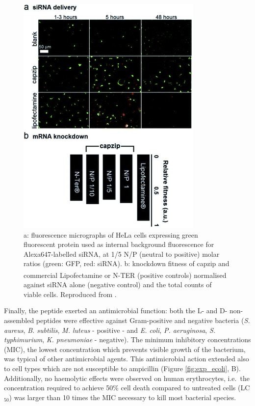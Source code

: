 \begin{figure}
\begin{center}
\includegraphics[width=0.6\linewidth, align = c]{1introduction/pics/capzip_delivery.png}
\caption[Capzip promoted RNA transfection]{a: fluorescence micrographs of HeLa cells expressing green fluorescent protein used as internal background fluorescence for Alexa647-labelled siRNA, at 1/5 N/P (neutral to positive) molar ratios (green: GFP, red: siRNA). b: knockdown fitness of capzip and commercial Lipofectamine\textsuperscript{\textregistered} or N-TER\textsuperscript{\textregistered} (positive controls) normalised against siRNA alone (negative control) and the total counts of viable cells. Reproduced from \citet{Castelletto2016}.} \label{fig:exp_rna}
\end{center}
\end{figure}

Finally, the peptide exerted an antimicrobial function: both the L- and D- non-assembled peptides were effective against Gram-positive and negative bacteria (\emph{S. aureus}, \emph{B. subtilis}, \emph{M. luteus} - positive - and \emph{E. coli}, \emph{P. aeruginosa}, \emph{S. typhimurium}, \emph{K. pneumoniae} - negative).
The minimum inhibitory concentrations (MIC), the lowest concentration which prevents visible growth of the bacterium, was typical of other antimicrobial agents. This antimicrobial action extended also to cell types which are not susceptible to ampicillin (Figure \ref{fig:exp_ecoli}, B).
%
Additionally, no haemolytic effects were observed on human erythrocytes, i.e.\ the concentration required to achieve 50\% cell death compared to untreated cells (LC$_{50}$) was larger than 10 times the MIC necessary to kill most bacterial species.

